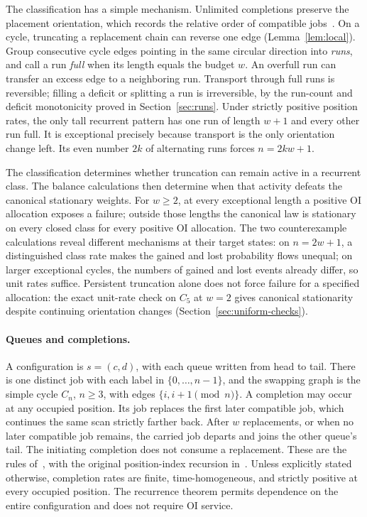 \documentclass[11pt]{article}
\theoremstyle{remark}
\begin{document}
The classification has a simple mechanism. Unlimited completions preserve the placement orientation, which records the relative order of compatible jobs~\cite[Lemma~1, p.~217]{DG}. On a cycle, truncating a replacement chain can reverse one edge (Lemma~\ref{lem:local}). Group consecutive cycle edges pointing in the same circular direction into \emph{runs}, and call a run \emph{full} when its length equals the budget $w$. An overfull run can transfer an excess edge to a neighboring run. Transport through full runs is reversible; filling a deficit or splitting a run is irreversible, by the run-count and deficit monotonicity proved in Section~\ref{sec:runs}. Under strictly positive position rates, the only tall recurrent pattern has one run of length $w+1$ and every other run full. It is exceptional precisely because transport is the only orientation change left. Its even number $2k$ of alternating runs forces $n=2kw+1$.

The classification determines whether truncation can remain active in a recurrent class. The balance calculations then determine when that activity defeats the canonical stationary weights. For $w\ge2$, at every exceptional length a positive OI allocation exposes a failure; outside those lengths the canonical law is stationary on every closed class for every positive OI allocation. The two counterexample calculations reveal different mechanisms at their target states: on $n=2w+1$, a distinguished class rate makes the gained and lost probability flows unequal; on larger exceptional cycles, the numbers of gained and lost events already differ, so unit rates suffice. Persistent truncation alone does not force failure for a specified allocation: the exact unit-rate check on $C_5$ at $w=2$ gives canonical stationarity despite continuing orientation changes (Section~\ref{sec:uniform-checks}).

\paragraph{Queues and completions.}
A configuration is $s=(c,d)$, with each queue written from head to tail. There is one distinct job with each label in $\{0,\ldots,n-1\}$, and the swapping graph is the simple cycle $C_n$, $n\ge3$, with edges $\{i,i+1\pmod n\}$. A completion may occur at any occupied position. Its job replaces the first later compatible job, which continues the same scan strictly farther back. After $w$ replacements, or when no later compatible job remains, the carried job departs and joins the other queue's tail. The initiating completion does not consume a replacement. These are the rules of~\cite[\S2.3, pp.~211--212; \S3.1, p.~215; \S5, p.~234]{DG}, with the original position-index recursion in~\cite[\S3.1, pp.~284--285]{CD}. Unless explicitly stated otherwise, completion rates are finite, time-homogeneous, and strictly positive at every occupied position. The recurrence theorem permits dependence on the entire configuration and does not require OI service.
\end{document}
